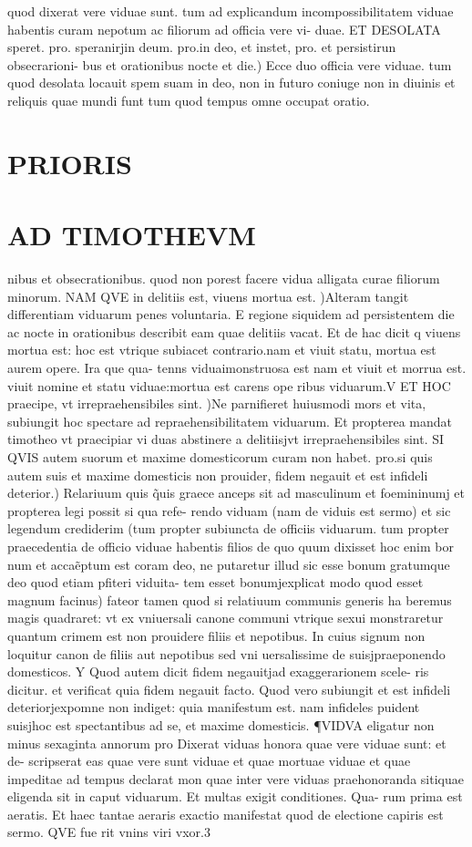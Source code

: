 \documentclass{article}
\begin{document}
\begin{pages}
quod dixerat vere viduae sunt. tum ad explicandum incompossibilitatem viduae habentis curam nepotum ac filiorum ad officia vere vi- duae. ET DESOLATA speret. pro. speranirjin deum. pro.in deo, et instet, pro. et persistirun obsecrarioni- bus et orationibus nocte et die.) Ecce duo officia vere viduae. tum quod desolata locauit spem suam in deo, non in futuro coniuge non in diuinis et reliquis quae mundi funt tum quod tempus omne occupat oratio.  \pend
\section*{PRIORIS }
\section*{AD TIMOTHEVM }\pstart nibus et obsecrationibus. quod non porest facere vidua alligata curae filiorum minorum. NAM QVE in delitiis est, viuens mortua est. )Alteram tangit differentiam viduarum penes voluntaria. E regione siquidem ad persistentem die ac nocte in orationibus describit eam quae delitiis vacat. Et de hac dicit q viuens mortua est: hoc est vtrique subiacet contrario.nam et viuit statu, mortua est aurem opere. Ira que qua- tenns viduaimonstruosa est nam et viuit et morrua est. viuit nomine et statu viduae:mortua est carens ope ribus viduarum.V ET HOC praecipe, vt irrepraehensibiles sint. )Ne parnifieret huiusmodi mors et vita, subiungit hoc spectare ad repraehensibilitatem viduarum. Et propterea mandat timotheo vt praecipiar vi duas abstinere a delitiisjvt irrepraehensibiles sint. SI QVIS autem suorum et maxime domesticorum curam non habet. pro.si quis autem suis et maxime domesticis non prouider, fidem negauit et est infideli deterior.) Relariuum quis q̃uis graece anceps sit ad masculinum et foemininumj et propterea legi possit si qua refe- rendo viduam (nam de viduis est sermo) et sic legendum crediderim (tum propter subiuncta de officiis viduarum. tum propter praecedentia de officio viduae habentis filios de quo quum dixisset hoc enim bor num et accaẽptum est coram deo, ne putaretur illud sic esse bonum gratumque deo quod etiam pfiteri viduita- tem esset bonumjexplicat modo quod esset magnum facinus) fateor tamen quod si relatiuum communis generis ha beremus magis quadraret: vt ex vniuersali canone communi vtrique sexui monstraretur quantum crimem est non prouidere filiis et nepotibus. In cuius signum non loquitur canon de filiis aut nepotibus sed vni uersalissime de suisjpraeponendo domesticos. Y Quod autem dicit fidem negauitjad exaggerarionem scele- ris dicitur. et verificat quia fidem negauit facto. Quod vero subiungit et est infideli deteriorjexpomne non indiget: quia manifestum est. nam infideles puident suisjhoc est spectantibus ad se, et maxime domesticis. ¶VIDVA eligatur non minus sexaginta annorum pro Dixerat viduas honora quae vere viduae sunt: et de- scripserat eas quae vere sunt viduae et quae mortuae viduae et quae impeditae ad tempus declarat mon quae inter vere viduas praehonoranda sitiquae eligenda sit in caput viduarum. Et multas exigit conditiones. Qua- rum prima est aeratis. Et haec tantae aeraris exactio manifestat quod de electione capiris est sermo. QVE fue rit vnins viri vxor.3 
\end{pages}
\end{document}
